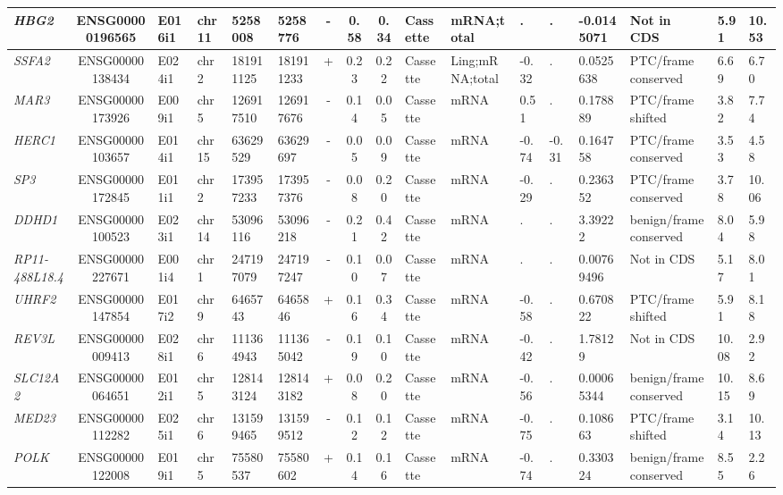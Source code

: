 \begin{appendices}
\begin{landscape}
\begin{table}
{\begin{tabular}{|l|c|l|l|l|l|c|c|c|l|l|l|l|l|l|l|l|}
		\textit{HBG2} & ENSG00000196565 & E016i1 & chr11 & 5258008 & 5258776 & -     & 0.58  & 0.34  & Cassette & mRNA;total & . & . & -0.0145071 & Not in CDS     & 5.91  &  10.53 \\ \hline
		\textit{SSFA2} & ENSG00000138434 & E024i1 & chr2  & 181911125 & 181911233 & +     & 0.23  & 0.22  & Cassette & Ling;mRNA;total & -0.32 & . & 0.0525638 & PTC/frame conserved & 6.69  &  6.70 \\ \hline
		\textit{MAR3} & ENSG00000173926 & E009i1 & chr5  & 126917510 & 126917676 & -     & 0.14  & 0.05  & Cassette & mRNA  & 0.51  & . & 0.178889 & PTC/frame shifted & 3.82  &  7.74 \\ \hline
		\textit{HERC1} & ENSG00000103657 & E014i1 & chr15 & 63629529 & 63629697 & -     & 0.05  & 0.09  & Cassette & mRNA  & -0.74 & -0.31 & 0.164758 & PTC/frame conserved & 3.53  &  4.58 \\ \hline
		\textit{SP3} & ENSG00000172845 & E011i1 & chr2  & 173957233 & 173957376 & -     & 0.08  & 0.20  & Cassette & mRNA  & -0.29 & . & 0.236352 & PTC/frame conserved & 3.78  &  10.06 \\ \hline
		\textit{DDHD1} & ENSG00000100523 & E023i1 & chr14 & 53096116 & 53096218 & -     & 0.21  & 0.42  & Cassette & mRNA  & . & . & 3.39222 & benign/frame conserved & 8.04  &  5.98 \\ \hline
		\textit{RP11-488L18.4} & ENSG00000227671 & E001i4 & chr1  & 247197079 & 247197247 & -     & 0.10  & 0.07  & Cassette & mRNA  & . & . & 0.00769496 & Not in CDS     & 5.17  &  8.01 \\ \hline
		\textit{UHRF2} & ENSG00000147854 & E017i2 & chr9  & 6465743 & 6465846 & +     & 0.16  & 0.34  & Cassette & mRNA  & -0.58 & . & 0.670822 & PTC/frame shifted & 5.91  &  8.18 \\ \hline
		\textit{REV3L} & ENSG00000009413 & E028i1 & chr6  & 111364943 & 111365042 & -     & 0.19  & 0.10  & Cassette & mRNA  & -0.42 & . & 1.78129 & Not in CDS    & 10.08 &  2.92 \\ \hline
		\textit{SLC12A2} & ENSG00000064651 & E012i1 & chr5  & 128143124 & 128143182 & +     & 0.08  & 0.20  & Cassette & mRNA  & -0.56 & . & 0.00065344 & benign/frame conserved & 10.15 &  8.69 \\ \hline
		\textit{MED23} & ENSG00000112282 & E025i1 & chr6  & 131599465 & 131599512 & -     & 0.12  & 0.12  & Cassette & mRNA  & -0.75 & . & 0.108663 & PTC/frame shifted & 3.14  &  10.13 \\ \hline
		\textit{POLK} & ENSG00000122008 & E019i1 & chr5  & 75580537 & 75580602 & +     & 0.14  & 0.16  & Cassette & mRNA  & -0.74 & . & 0.330324 & benign/frame conserved & 8.55  &  2.26 \\ \hline

\end{tabular}}
\end{table}
\end{landscape}
\end{appendices}

